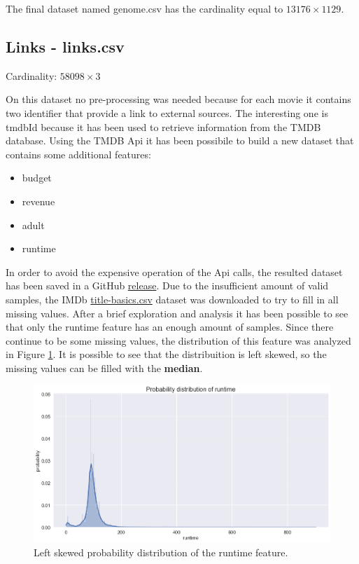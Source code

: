 \documentclass[../main]{subfiles}
\begin{document}
The final dataset named genome.csv has the cardinality equal to $13176 \times 1129$.

\subsection*{Links - links.csv}
Cardinality: $58098 \times 3$

On this dataset no pre-processing was needed because for each movie it contains two identifier that provide a link to external sources.
The interesting one is tmdbId because it has been used to retrieve information from the TMDB database.
Using the TMDB Api it has been possibile to build a new dataset that contains some additional features:
\begin{itemize}
    \item budget
    \item revenue
    \item adult
    \item runtime
\end{itemize}
In order to avoid the expensive operation of the Api calls, the resulted dataset has been saved in a GitHub \href{https://github.com/prushh/movie-lens-mlp/releases/tag/api-dataset}{release}.
Due to the insufficient amount of valid samples, the IMDb \href{https://datasets.imdbws.com/title.basics.tsv.gz}{title-basics.csv} dataset was downloaded to try to fill in all missing values.
After a brief exploration and analysis it has been possible to see that only the runtime feature has an enough amount of samples.
Since there continue to be some missing values, the distribution of this feature was analyzed in Figure \ref{fig:runtime_distribution_missing}.
It is possible to see that the distribuition is left skewed, so the missing values can be filled with the \textbf{median}.

\begin{figure}[h]
    \includegraphics[width=\linewidth]{figures/runtime_distribution_missing.png}
    \caption{Left skewed probability distribution of the runtime feature.}
    \label{fig:runtime_distribution_missing}
\end{figure}
\end{document}
